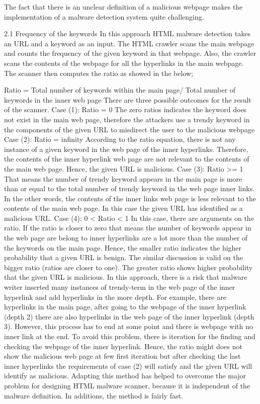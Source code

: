 The fact that there is an unclear definition of a malicious webpage makes the implementation of a malware detection system quite challenging. 	  
	


2.1 Frequency of the keywords
In this approach HTML malware detection takes an URL and a keyword as an input. The HTML crawler scans the main webpage and counts the frequency of the given keyword in that webpage. Also, the crawler scans the contents of the webpage for all the hyperlinks in the main webpage. The scanner then computes the ratio as showed in the below;

Ratio = Total number of keywords within the main page/ Total number of keywords in the inner web page 
There are three possible outcomes for the result of the scanner. 
Case (1): Ratio = 0
The zero ratios indicates the keyword does not exist in the main web page, therefore the attackers use a trendy keyword in the components of the given URL to misdirect the user to the malicious webpage
Case (2): Ratio = infinity
According to the ratio equation, there is not any instance of a given keyword in the web page of the inner hyperlinks. Therefore, the contents of the inner hyperlink web page are not relevant to the contents of the main web page. Hence, the given URL is malicious.
Case (3): Ratio >= 1
That means the number of trendy keyword appears in the main page is more than or equal to the total number of trendy keyword in the web page inner links. In the other words, the contents of the inner links web page is less relevant to the contents of the main web page. In this case the given URL has identified as a malicious URL. 
Case (4): 0 < Ratio < 1
In this case, there are arguments on the ratio. If the ratio is closer to zero that means the number of keywords appear in the web page are belong to inner hyperlinks are a lot more than the number of the keywords on the main page. Hence, the smaller ratio indicates the higher probability that a given URL is benign. The similar discussion is valid on the bigger ratio (ratios are closer to one). The greater ratio shows higher probability that the given URL is malicious. 
In this approach, there is a risk that malware writer inserted many instances of trendy-term in the web page of the inner hyperlink and add hyperlinks in the more depth. For example, there are hyperlinks in the main page, after going to the webpage of the inner hyperlink (depth 2) there are also hyperlinks in the web page of the inner hyperlink (depth 3). However, this process has to end at some point and there is webpage with no inner link at the end. To avoid this problem, there is iteration for the finding and checking the webpage of the inner hyperlink. Hence, the ratio might does not show the malicious web page at few first iteration but after checking the last inner hyperlinks the requirements of case (2) will satisfy and the given URL will identify as malicious.
Adapting this method has helped to overcome the major problem for designing HTML malware scanner, because it is independent of the malware definition. In additions, the method is fairly fast.  
